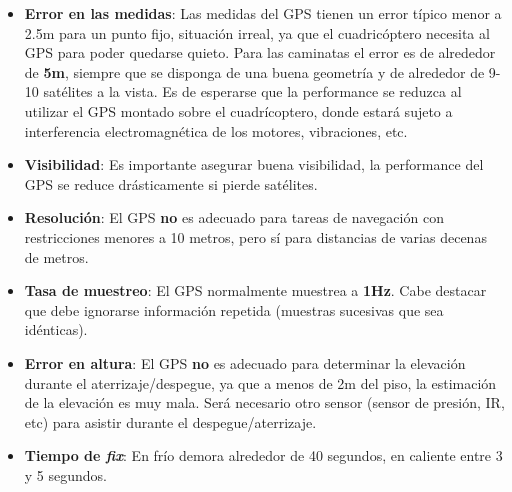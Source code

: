 \documentclass[main]{subfiles}
\begin{document}
\begin{itemize}
\item \textbf{Error en las medidas}: Las medidas del GPS tienen un error t\'ipico menor a 2.5m para un punto fijo, situaci\'on irreal, ya que el cuadric\'optero necesita al GPS para poder quedarse quieto. Para las caminatas el error es de alrededor de \textbf{5m}, siempre que se disponga de una buena geometr\'ia y de alrededor de 9-10 sat\'elites a la vista. Es de esperarse que la performance se reduzca al utilizar el GPS montado sobre el cuadr\'icoptero, donde estar\'a sujeto a interferencia electromagnética de los motores, vibraciones, etc.
\item \textbf{Visibilidad}: Es importante asegurar buena visibilidad, la performance del GPS se reduce drásticamente si pierde satélites.
\item \textbf{Resolución}: El GPS \textbf{no} es adecuado para tareas de navegación con restricciones menores a 10 metros, pero sí para distancias de varias decenas de metros.
\item \textbf{Tasa de muestreo}: El GPS normalmente muestrea a \textbf{1Hz}. Cabe destacar que debe ignorarse información repetida (muestras sucesivas que sea idénticas).
\item \textbf{Error en altura}: El GPS \textbf{no} es adecuado para determinar la elevación durante el aterrizaje/despegue, ya que a menos de 2m del piso, la estimación de la elevación es muy mala. Será necesario otro sensor (sensor de presión, IR, etc) para asistir durante el despegue/aterrizaje.
\item \textbf{Tiempo de \textit{fix}}: En frío demora alrededor de 40 segundos, en caliente entre 3 y 5 segundos.
\end{itemize}
\end{document}
